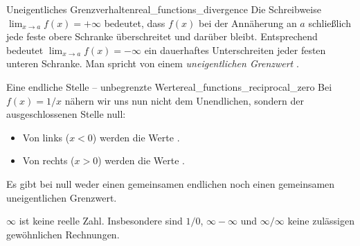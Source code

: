 \par\noindent\begin{minipage}{\linewidth}
\begin{DefinitionBox}{Uneigentliches Grenzverhalten}{real_functions_divergence}
  Die Schreibweise $\lim_{x\to a}f(x)=+\infty$ bedeutet, dass $f(x)$
  bei der Annäherung an $a$ schließlich
  jede feste obere Schranke überschreitet und darüber bleibt.
  Entsprechend bedeutet $\lim_{x\to a}f(x)=-\infty$ ein dauerhaftes Unterschreiten
  jeder festen unteren Schranke. Man spricht von einem
  \emph{uneigentlichen Grenzwert} .
\end{DefinitionBox}
\begin{ExampleBox}[before skip=0.3\baselineskip]{Eine endliche Stelle -- unbegrenzte Werte}{real_functions_reciprocal_zero}
  Bei $f(x)=1/x$ nähern wir uns nun nicht dem Unendlichen, sondern der
  ausgeschlossenen Stelle null:
  \begin{itemize}
    \item Von links ($x<0$) werden die Werte
      .
    \item Von rechts ($x>0$) werden die Werte
      .
  \end{itemize}
  \par\medskip
  Es gibt bei null weder einen gemeinsamen endlichen noch einen
  gemeinsamen uneigentlichen Grenzwert.
  \begin{center}
  \end{center}
\end{ExampleBox}
\end{minipage}

\begin{RemarkBox}
  $\infty$ ist keine reelle Zahl. Insbesondere sind
  $1/0$, $\infty-\infty$ und $\infty/\infty$ keine zulässigen
  gewöhnlichen Rechnungen.
\end{RemarkBox}
